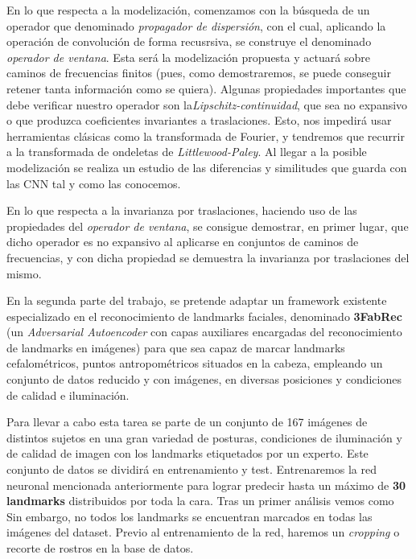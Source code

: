 \noindent En lo que respecta a la modelización, comenzamos con la búsqueda de un operador que denominado \textit{propagador de dispersión}, con el cual,  aplicando la operación de convolución de forma recusrsiva, se construye el denominado \textit{operador de ventana}. Esta será la modelización propuesta y actuará sobre caminos de frecuencias finitos (pues, como demostraremos, se puede conseguir retener tanta información como se quiera). Algunas propiedades importantes que debe verificar nuestro operador son la\textit{Lipschitz-continuidad}, que sea no expansivo o que produzca coeficientes invariantes a traslaciones. Esto, nos impedirá usar herramientas clásicas como la transformada de Fourier, y tendremos que recurrir a la transformada de ondeletas de \textit{Littlewood-Paley}. Al llegar a la posible modelización se realiza un estudio de las diferencias y similitudes que guarda con las CNN tal y como las conocemos.

\medskip

\noindent En lo que respecta a la invarianza por traslaciones, haciendo uso de las propiedades del \textit{operador de ventana}, se consigue demostrar, en primer lugar, que dicho operador es no expansivo al aplicarse en conjuntos de caminos de frecuencias, y con dicha propiedad se demuestra la invarianza por traslaciones del mismo.

\medskip

\noindent En la segunda parte del trabajo, se pretende adaptar un framework existente especializado en el reconocimiento de landmarks faciales, denominado \textbf{3FabRec} (un \textit{Adversarial Autoencoder} con capas auxiliares encargadas del reconocimiento de landmarks en imágenes) para que sea capaz de marcar landmarks cefalométricos, puntos antropométricos situados en la cabeza, empleando un conjunto de datos reducido y con imágenes, en diversas posiciones y condiciones de calidad e iluminación.

\medskip

\noindent Para llevar a cabo esta tarea se parte de un conjunto de 167 imágenes de distintos sujetos en una gran variedad de posturas, condiciones de iluminación y de calidad de imagen con los landmarks etiquetados por un experto. Este conjunto de datos se dividirá en entrenamiento y test. Entrenaremos la red neuronal mencionada anteriormente para lograr predecir hasta un máximo de \textbf{30 landmarks} distribuidos por toda la cara. Tras un primer análisis vemos como Sin embargo, no todos los landmarks se encuentran marcados en todas las imágenes del dataset. Previo al entrenamiento de la red, haremos un \textit{cropping} o recorte de rostros en la base de datos. 

